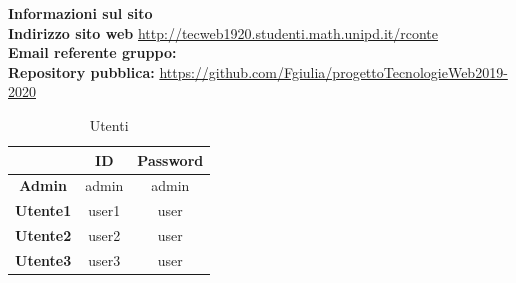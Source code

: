 \begin{center}
	\textbf{\Large{Informazioni sul sito}}\\
	\textbf{Indirizzo sito web} \url{http://tecweb1920.studenti.math.unipd.it/rconte}\\
	\textbf{Email referente gruppo:} \\
	\textbf{Repository pubblica:} \url{https://github.com/Fgiulia/progettoTecnologieWeb2019-2020}\\
	\renewcommand{\arraystretch}{1.8}
	\begin{longtable}[H]{c c c}
		\caption{Utenti}\\
		\rowcolor[HTML]{58c25d}
		\multicolumn{1}{c}{\color[HTML]{FFFFFF} \textbf{Utente}} &
		\multicolumn{1}{c}{\color[HTML]{FFFFFF} \textbf{ID}} &
		\multicolumn{1}{c}{\color[HTML]{FFFFFF} \textbf{Password}} \\
		\endhead
		\textbf{Admin} & admin & admin\\
		\textbf{Utente1} & user1 & user\\
		\textbf{Utente2} & user2 & user\\
		\textbf{Utente3} & user3 & user\\
	\end{longtable}
\end{center}
